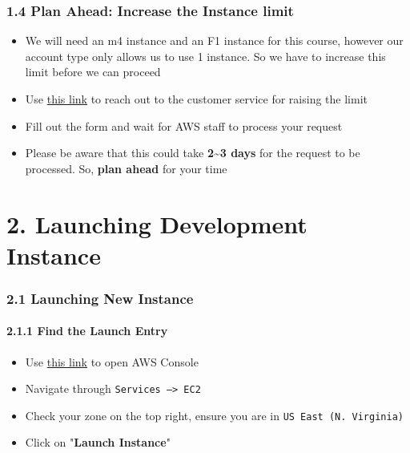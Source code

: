\documentclass[]{article}
\let\oldparagraph\paragraph
\renewcommand{\paragraph}[1]{\oldparagraph{#1}\mbox{}}
\begin{document}
\hypertarget{header-n534}{%
\subsubsection{1.4 Plan Ahead: Increase the Instance
limit}\label{header-n534}}

\begin{itemize}
\item
  We will need an m4 instance and an F1 instance for this course,
  however our account type only allows us to use 1 instance. So we have
  to increase this limit before we can proceed
\item
  Use
  \href{https://console.aws.amazon.com/support/v1\#/case/create}{this
  link} to reach out to the customer service for raising the limit
\item
  Fill out the form and wait for AWS staff to process your request
\item
  Please be aware that this could take \textbf{2\textasciitilde{}3 days}
  for the request to be processed. So, \textbf{plan ahead} for your time
\end{itemize}

\hypertarget{header-n84}{%
\section{2. Launching Development Instance}\label{header-n84}}

\hypertarget{header-n85}{%
\subsubsection{2.1 Launching New Instance}\label{header-n85}}

\hypertarget{header-n86}{%
\paragraph{2.1.1 Find the Launch Entry}\label{header-n86}}

\begin{itemize}
\item
  Use \href{https://console.aws.amazon.com/}{this link} to open AWS
  Console
\item
  Navigate through \texttt{Services\ —\textgreater{}\ EC2} 
\item
  Check your zone on the top right, ensure you are in
  \texttt{US\ East\ (N.\ Virginia)}
\item
  Click on "\textbf{Launch Instance}"
\end{itemize}
\end{document}

